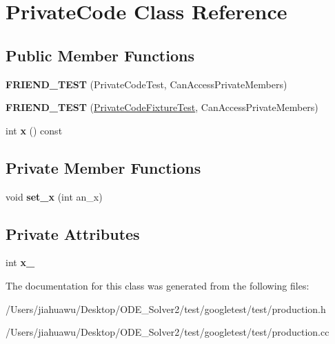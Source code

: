 \hypertarget{class_private_code}{}\section{Private\+Code Class Reference}
\label{class_private_code}
\subsection*{Public Member Functions}
\begin{DoxyCompactItemize}
\item 
\mbox{\label{class_private_code_a9a74a333501232539ab1636f0928d8f2}} 
{\bfseries F\+R\+I\+E\+N\+D\+\_\+\+T\+E\+ST} (Private\+Code\+Test, Can\+Access\+Private\+Members)
\item 
\mbox{\label{class_private_code_a29b6823300f68d78691476eeeaed8a7c}} 
{\bfseries F\+R\+I\+E\+N\+D\+\_\+\+T\+E\+ST} (\mbox{\hyperlink{classtesting_1_1_test}{Private\+Code\+Fixture\+Test}}, Can\+Access\+Private\+Members)
\item 
\mbox{\label{class_private_code_a247781246ce4d0c66563eaa39ba5aaa9}} 
int {\bfseries x} () const
\end{DoxyCompactItemize}
\subsection*{Private Member Functions}
\begin{DoxyCompactItemize}
\item 
\mbox{\label{class_private_code_a8d8ac6564d6425ea793f85848bb21b39}} 
void {\bfseries set\+\_\+x} (int an\+\_\+x)
\end{DoxyCompactItemize}
\subsection*{Private Attributes}
\begin{DoxyCompactItemize}
\item 
\mbox{\label{class_private_code_a3590a614d8c76fa34fa4cea6f340c37f}} 
int {\bfseries x\+\_\+}
\end{DoxyCompactItemize}


The documentation for this class was generated from the following files\+:\begin{DoxyCompactItemize}
\item 
/\+Users/jiahuawu/\+Desktop/\+O\+D\+E\+\_\+\+Solver2/test/googletest/test/production.\+h\item 
/\+Users/jiahuawu/\+Desktop/\+O\+D\+E\+\_\+\+Solver2/test/googletest/test/production.\+cc\end{DoxyCompactItemize}
